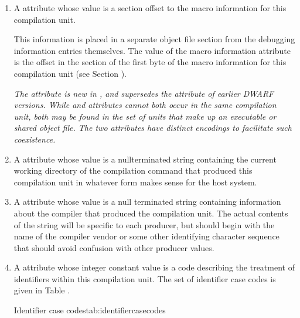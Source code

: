 \begin{enumerate}[1. ]
\item A \DWATmacros{}\hypertarget{chap:DWATmacrosmacroinformation}{}
attribute 
whose value is a 
section offset to the macro information for this compilation unit.

This information is placed in a separate object file section
from the debugging information entries themselves. The
value of the macro information attribute is the offset in
the \dotdebugmacro{} section of the first byte of the macro
information for this compilation unit 
(see Section ).

\textit{The \DWATmacros{} attribute is new in \DWARFVersionV, 
and supersedes the 
\DWATmacroinfo{} attribute of earlier DWARF versions.
While \DWATmacros{} and \DWATmacroinfo{} attributes cannot both occur in the same
compilation unit, both may be found in the set of units that make up an executable
or shared object file. The two attributes have distinct encodings to facilitate such
coexistence.}

\item  A 
\DWATcompdir{} 
attribute 
\hypertarget{chap:DWATcompdircompilationdirectory}{}
whose value is a
null\dash terminated string containing the current working directory
of the compilation command that produced this compilation
unit in whatever form makes sense for the host system.

\item  A \DWATproducer{} attribute 
whose value is a null\dash
terminated string containing information about the compiler
\hypertarget{chap:DWATproducercompileridentification}{}
that produced the compilation unit. The actual contents of
the string will be specific to each producer, but should
begin with the name of the compiler vendor or some other
identifying character sequence that should avoid confusion
with other producer values.

\item  A \DWATidentifiercase{} 
attribute 
whose integer
\hypertarget{chap:DWATidentifiercaseidentifiercaserule}{}
constant value is a code describing the treatment
of identifiers within this compilation unit. The
set of identifier case codes is given in
Table .

\begin{simplenametable}{Identifier case codes}{tab:identifiercasecodes}
\DWIDcasesensitive{}      \\
\DWIDupcase{}             \\
\DWIDdowncase{}           \\
\DWIDcaseinsensitive{}    \\
\end{simplenametable}


\end{enumerate}
